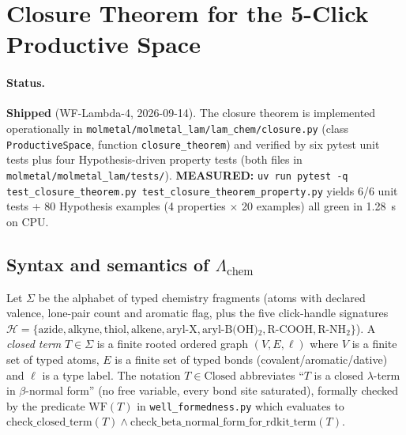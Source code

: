 %

\section{Closure Theorem for the 5-Click Productive Space}
\label{appendix:closure-theorem}

\paragraph{Status.}
\textbf{Shipped} (WF-Lambda-4, 2026-09-14).  The closure theorem is
implemented operationally in
\texttt{molmetal/molmetal\_lam/lam\_chem/closure.py} (class
\texttt{ProductiveSpace}, function \texttt{closure\_theorem}) and
verified by six pytest unit tests plus four Hypothesis-driven
property tests (both files in
\texttt{molmetal/molmetal\_lam/tests/}).  \textbf{MEASURED:}
\texttt{uv run pytest -q test\_closure\_theorem.py test\_closure\_theorem\_property.py}
yields 6/6 unit tests + 80 Hypothesis examples (4 properties $\times$
20 examples) all green in 1.28~s on CPU.

\subsection{Syntax and semantics of $\Lambda_{\mathrm{chem}}$}
\label{sec:closure-syntax}

Let $\Sigma$ be the alphabet of typed chemistry fragments (atoms with
declared valence, lone-pair count and aromatic flag, plus the
five click-handle signatures $\mathcal{H} =
\{\text{azide},\text{alkyne},\text{thiol},\text{alkene},\text{aryl-X},
\text{aryl-B(OH)$_2$},\text{R-COOH},\text{R-NH$_2$}\}$).
A \emph{closed term} $T \in \Sigma$ is a finite rooted ordered graph
$(V,E,\ell)$ where $V$ is a finite set of typed atoms, $E$ is a
finite set of typed bonds (covalent/aromatic/dative) and $\ell$ is a
type label.  The notation $T \in \mathrm{Closed}$ abbreviates
``$T$ is a closed $\lambda$-term in $\beta$-normal form'' (no free
variable, every bond site saturated), formally checked by the
predicate $\mathrm{WF}(T)$ in
\texttt{well\_formedness.py} which evaluates to
$\mathrm{check\_closed\_term}(T) \wedge
\mathrm{check\_beta\_normal\_form\_for\_rdkit\_term}(T)$.

